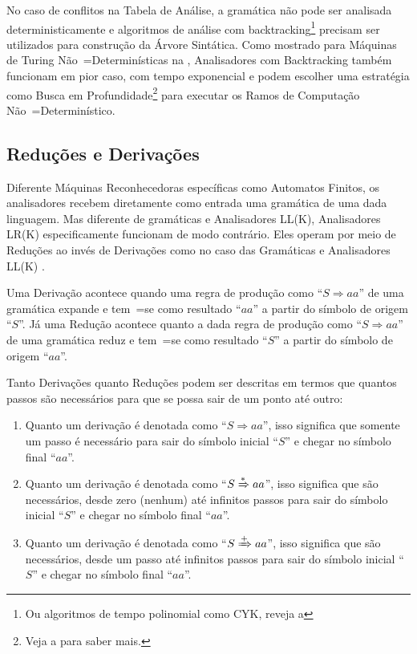 {    No caso de conflitos na Tabela de Análise,
    a gramática não pode ser analisada deterministicamente e
    algoritmos de análise com backtracking\footnote{
    Ou algoritmos de tempo polinomial como CYK,
    reveja a 
    }
    precisam ser utilizados para construção da Árvore Sintática.
    Como mostrado para Máquinas de Turing Não~=Determinísticas na ,
    Analisadores com Backtracking também funcionam em pior caso,
    com tempo exponencial e
    podem escolher uma estratégia como Busca em Profundidade\footnote{
    Veja a  para saber mais.
    } para executar os Ramos de Computação Não~=Determinístico.


\subsection{Reduções e Derivações}
\label{reducoesEderivacoes}

    Diferente Máquinas Reconhecedoras específicas como Automatos Finitos,
    os analisadores recebem diretamente como entrada uma gramática de uma dada linguagem.
    Mas diferente de gramáticas e
    Analisadores LL(K),
    Analisadores LR(K) especificamente funcionam de modo contrário.
    Eles operam por meio de Reduções ao invés de Derivações como no caso das Gramáticas e
    Analisadores LL(K) \cite{ahoCompilerDragonBook}.

    Uma Derivação acontece quando uma regra de produção como ``$S \Rightarrow a a $'' de uma gramática expande e
    tem~=se como resultado ``$a a$'' a partir do símbolo de origem ``$S$''.
    Já uma Redução acontece quanto a dada regra de produção como ``$S \Rightarrow a a $'' de uma gramática reduz e
    tem~=se como resultado ``$S$'' a partir do símbolo de origem ``$a a$''.

    Tanto Derivações quanto Reduções podem ser descritas em termos que quantos passos são necessários para que se possa sair de um ponto até outro:
    \begin{enumerate}%
        \item Quanto um derivação é denotada como ``$S \Rightarrow a a $'',
        isso significa que somente um passo é necessário para sair do símbolo inicial ``$S$'' e
        chegar no símbolo final ``$a a$''.
        \item Quanto um derivação é denotada como ``$S \xRightarrow{*} a a $'',
        isso significa que são necessários,
        desde zero (nenhum) até infinitos passos para sair do símbolo inicial ``$S$'' e
        chegar no símbolo final ``$a a$''.
        \item Quanto um derivação é denotada como ``$S \xRightarrow{+} a a $'',
        isso significa que são necessários,
        desde um passo até infinitos passos para sair do símbolo inicial ``$S$'' e
        chegar no símbolo final ``$a a$''.
    \end{enumerate}

}
